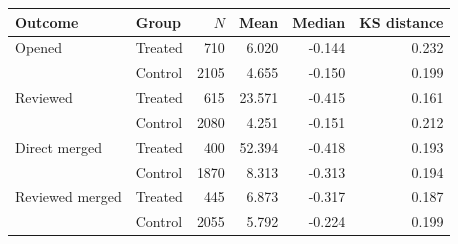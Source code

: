 \small
\begin{tabular}{llrrrr}
\toprule
Outcome & Group & $N$ & Mean & Median & KS distance \\
\midrule
Opened & Treated & 710 & 6.020 & -0.144 & 0.232 \\
       & Control & 2105 & 4.655 & -0.150 & 0.199 \\
Reviewed & Treated & 615 & 23.571 & -0.415 & 0.161 \\
         & Control & 2080 & 4.251 & -0.151 & 0.212 \\
Direct merged & Treated & 400 & 52.394 & -0.418 & 0.193 \\
              & Control & 1870 & 8.313 & -0.313 & 0.194 \\
Reviewed merged & Treated & 445 & 6.873 & -0.317 & 0.187 \\
                & Control & 2055 & 5.792 & -0.224 & 0.199 \\
\bottomrule
\end{tabular}
